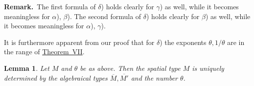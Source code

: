 \documentclass[b5paper,twoside]{article}
\newcommand{\thmref}[2]{\hyperref[#1]{\mbox{Theorem~#2}}}
\theoremstyle{mvnplain}
\newtheorem{lemma}{Lemma}[section]
\newcommand{\M}{\mathbf M}
\def\M{M}%
\def\widetilde#1{#1}%
\begin{document}
\par{}
\noindent\textbf{Remark.}\ 
The first formula of \(\delta\)) holds clearly for \(\gamma\)) as well, while
it becomes meaningless for \(\alpha\)), \(\beta\)). The second formula of
\(\delta\)) holds clearly for \(\beta\)) as well, while it becomes meaningless
for \(\alpha\)), \(\gamma\)).

It is furthermore apparent from our proof that for \(\delta\)) the exponents
\(\theta,1/\theta\) are in the range of \thmref{thm:VII}{VII}.
\par{}

\begin{lemma}\label{lem:3.3.3}
Let \(\M\) and \(\theta\) be as above. Then the spatial type
\(\widetilde{\M}\) is uniquely determined by the algebraical types
\(\overline{\M},\overline{\M'}\) and the number \(\theta\).
\end{lemma}
\end{document}
